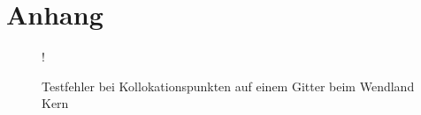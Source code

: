 \chapter{Anhang}
\label{cha:Anhang}

\begin{figure}[H]
\centering
\resizebox {\columnwidth} {!} {

}
\caption{Testfehler bei Kollokationspunkten auf einem Gitter beim Wendland Kern}
\label{fig:wendland-error-grid-both}
\end{figure}